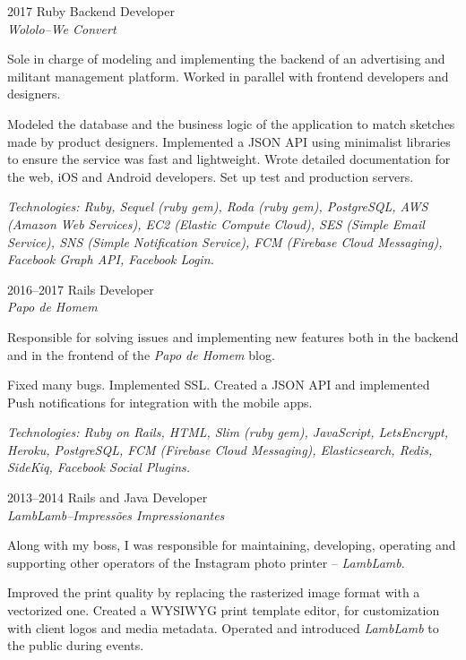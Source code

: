 \documentclass[a4paper]{simplecv}
\begin{document}
\begin{topic}
\item[2017] Ruby Backend Developer\\
	{\em\small Wololo--We Convert}

	Sole in charge of modeling and implementing the backend of an
	advertising and militant management platform. Worked in parallel with
	frontend developers and designers.

	Modeled the database and the business logic of the application to match
	sketches made by product designers. Implemented a JSON API using
	minimalist libraries to ensure the service was fast and lightweight.
	Wrote detailed documentation for the web, iOS and Android developers.
	Set up test and production servers.

	{\em\scriptsize Technologies: Ruby, Sequel (ruby gem), Roda (ruby gem),
	PostgreSQL, AWS (Amazon Web Services), EC2 (Elastic Compute Cloud), SES
	(Simple Email Service), SNS (Simple Notification Service), FCM
	(Firebase Cloud Messaging), Facebook Graph API, Facebook Login.}

\item[2016--2017] Rails Developer\\
	{\em\small Papo de Homem}

	Responsible for solving issues and implementing new features both in
	the backend and in the frontend of the \emph{Papo de Homem} blog.

	Fixed many bugs. Implemented SSL. Created a JSON API and implemented
	Push notifications for integration with the mobile apps.

	{\em\scriptsize Technologies: Ruby on Rails, HTML, Slim (ruby gem),
	JavaScript, LetsEncrypt, Heroku, PostgreSQL, FCM (Firebase Cloud
	Messaging), Elasticsearch, Redis, SideKiq, Facebook Social Plugins.}

\item[2013--2014] Rails and Java Developer\\
	{\em\small LambLamb--Impressões Impressionantes}

	Along with my boss, I was responsible for maintaining, developing,
	operating and supporting other operators of the Instagram photo printer
	-- \emph{LambLamb}.

	Improved the print quality by replacing the rasterized image format
	with a vectorized one. Created a WYSIWYG print template editor, for
	customization with client logos and media metadata. Operated and
	introduced \emph{LambLamb} to the public during events.


\end{topic}
\end{document}
